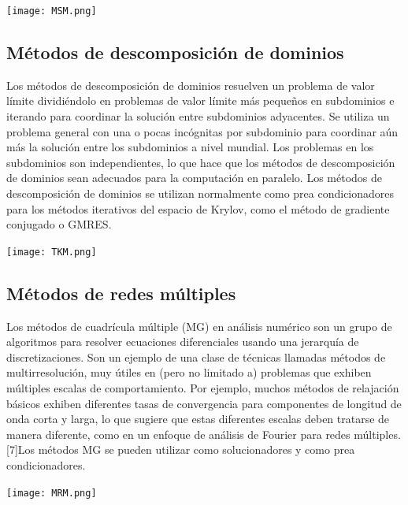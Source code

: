 \documentclass[12pt]{article}
\begin{document}
   \begin{center}
         \texttt{[image: MSM.png]}
   \end{center}
   

\subsection{Métodos de descomposición de dominios}
   
  Los métodos de descomposición de dominios resuelven un problema de valor límite dividiéndolo en problemas de valor límite más pequeños en subdominios e iterando para coordinar la solución entre subdominios adyacentes. Se utiliza un problema general con una o pocas incógnitas por subdominio para coordinar aún más la solución entre los subdominios a nivel mundial. Los problemas en los subdominios son independientes, lo que hace que los métodos de descomposición de dominios sean adecuados para la computación en paralelo. Los métodos de descomposición de dominios se utilizan normalmente como prea condicionadores para los métodos iterativos del espacio de Krylov, como el método de gradiente conjugado o GMRES.

   \begin{center}
         \texttt{[image: TKM.png]}
   \end{center}
   
   
\subsection{Métodos de redes múltiples}
   
  Los métodos de cuadrícula múltiple (MG) en análisis numérico son un grupo de algoritmos para resolver ecuaciones diferenciales usando una jerarquía de discretizaciones. Son un ejemplo de una clase de técnicas llamadas métodos de multirresolución, muy útiles en (pero no limitado a) problemas que exhiben múltiples escalas de comportamiento. Por ejemplo, muchos métodos de relajación básicos exhiben diferentes tasas de convergencia para componentes de longitud de onda corta y larga, lo que sugiere que estas diferentes escalas deben tratarse de manera diferente, como en un enfoque de análisis de Fourier para redes múltiples. [7]Los métodos MG se pueden utilizar como solucionadores y como prea condicionadores.

   \begin{center}
         \texttt{[image: MRM.png]}
   \end{center}
   

\end{document}
